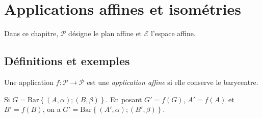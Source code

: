
\TCDLessonStyleOn
\providecommand{\Plan}{\mathscr{P}}
\providecommand{\Espace}{\mathcal{E}}
\providecommand{\bary}[1]{\mathrm{Bar}\left\lbrace #1 \right\rbrace}
\providecommand{\Id}{\mathrm{Id}}
\chapter{Applications affines et isom\'etries}
      Dans ce chapitre, $\Plan$ d\'esigne le plan affine et $\Espace$ l'espace affine.
      \section{D\'efinitions et exemples}
            \begin{defi}
                  Une application $f : \Plan \rightarrow \Plan$ est une \emph{application affine}
                  si elle conserve le barycentre.
                  
                  Si $G = \bary{(A,\alpha) ; (B,\beta)}$.
                  En posant $G' = f(G)$, $A' = f(A)$ et $B' = f(B)$, on a 
                  $G' = \bary{(A',\alpha) ; (B',\beta)}$.
            \end{defi}
